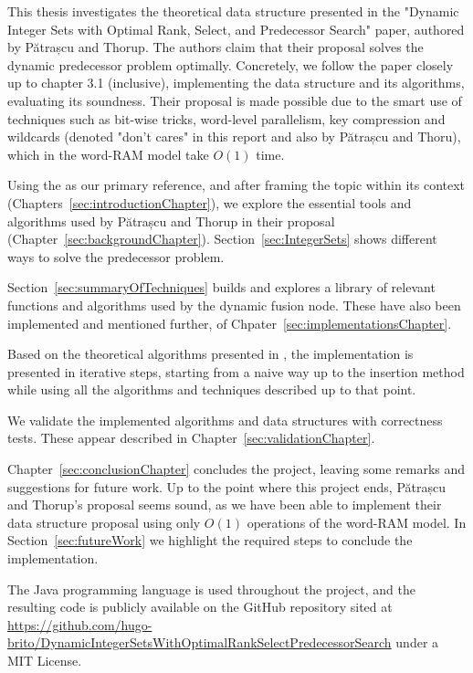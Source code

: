 
This thesis investigates the theoretical data structure presented in the "Dynamic Integer Sets with Optimal Rank, Select, and Predecessor Search" paper, authored by Pătrașcu and Thorup.
The authors claim that their proposal solves the dynamic predecessor problem optimally. Concretely, we follow the paper closely up to chapter 3.1 (inclusive), implementing the data structure and its algorithms, evaluating its soundness.
Their proposal is made possible due to the smart use of techniques such as bit-wise tricks, word-level parallelism, key compression and wildcards (denoted "don't cares" in this report and also by Pătrașcu and Thoru), which in the word-RAM model take $O(1)$ time.

Using the \cite{patrascu2014dynamic} as our primary reference, and after framing the topic within its context (Chapters~\ref{sec:introductionChapter}), we explore the essential tools and algorithms used by Pătrașcu and Thorup in their proposal (Chapter~\ref{sec:backgroundChapter}).
Section~\ref{sec:IntegerSets} shows different ways to solve the predecessor problem.

Section~\ref{sec:summaryOfTechniques} builds and explores a library of relevant functions and algorithms used by the dynamic fusion node. These have also been implemented and mentioned further, of Chpater~\ref{sec:implementationsChapter}.

Based on the theoretical algorithms presented in \cite{patrascu2014dynamic}, the implementation is presented in iterative steps, starting from a naive way up to the insertion method while using all the algorithms and techniques described up to that point.

We validate the implemented algorithms and data structures with correctness tests. These appear described in Chapter~\ref{sec:validationChapter}.

Chapter~\ref{sec:conclusionChapter} concludes the project, leaving some remarks and suggestions for future work.
Up to the point where this project ends, Pătrașcu and Thorup's proposal seems sound, as we have been able to implement their data structure proposal using only $O(1)$ operations of the word-RAM model. In Section~\ref{sec:futureWork} we highlight the required steps to conclude the implementation.

The Java programming language is used throughout the project, and the resulting code is publicly available on the GitHub repository sited at \url{https://github.com/hugo-brito/DynamicIntegerSetsWithOptimalRankSelectPredecessorSearch} under a MIT License.

